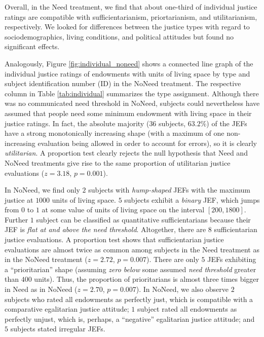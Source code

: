\documentclass[12pt]{scrartcl}
\begin{document}
Overall, in the Need treatment, we find that about one-third of individual justice ratings are compatible with sufficientarianism, priortarianism, and utilitarianism, respectively.
We looked for differences between the justice types with regard to sociodemographics, living conditions, and political attitudes but found no significant effects.

Analogously, Figure \ref{fig:individual_noneed} shows a connected line graph of the individual justice ratings of endowments with units of living space by type and subject identification number (ID) in the NoNeed treatment.
The respective column in Table \ref{tab:individual} summarizes the type assignment.
Although there was no communicated need threshold in NoNeed, subjects could nevertheless have assumed that people need some minimum endowment with living space in their justice ratings.
In fact, the absolute majority ($36$ subjects, $63.2\%$) of the JEFs have a strong monotonically increasing shape (with a maximum of one non-increasing evaluation being allowed in order to account for errors), so it is clearly \textit{utilitarian}.
A proportion test clearly rejects the null hypothesis that Need and NoNeed treatments give rise to the same proportion of utilitarian justice evaluations ($z=3.18$, $p=0.001$).

In NoNeed, we find only $2$ subjects with \textit{hump-shaped} JEFs with the maximum justice at $1000$ units of living space.
$5$ subjects exhibit a \textit{binary} JEF, which jumps from $0$ to $1$ at some value of units of living space on the interval $[200,1800]$.
Further $1$ subject can be classified as quantitative sufficientarians because their JEF is \textit{flat at and above the need threshold}.
Altogether, there are $8$ sufficientarian justice evaluations.
A proportion test shows that sufficientarian justice evaluations are almost twice as common among subjects in the Need treatment as in the NoNeed treatment ($z=2.72$, $p=0.007$).
There are only $5$ JEFs exhibiting a ``prioritarian'' shape (assuming \textit{zero below} some assumed \textit{need threshold} greater than $400$ units).
Thus, the proportion of prioritarians is almost three times bigger in Need as in NoNeed ($z=2.70$, $p=0.007$).
In NoNeed, we also observe $2$ subjects who rated all endowments as perfectly just, which is compatible with a comparative egalitarian justice attitude; $1$ subject rated all endowments as perfectly unjust, which is, perhaps, a ``negative'' egalitarian justice attitude; and $5$ subjects stated irregular JEFs.
\end{document}
